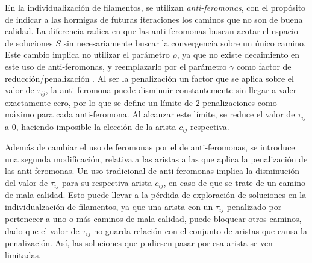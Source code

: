 En la individualizaci\'on de filamentos, se utilizan {\it anti-feromonas}, con el prop\'osito de indicar a las hormigas de futuras iteraciones los caminos que no son de buena calidad. La diferencia radica en que las anti-feromonas buscan acotar el espacio de soluciones $S$ sin necesariamente buscar la convergencia sobre un \'unico camino. Este cambio implica no utilizar el par\'ametro $\rho$, ya que no existe decaimiento en este uso de anti-feromonas, y reemplazarlo por el par\'ametro $\gamma$ como factor de reducci\'on/penalizaci\'on . Al ser la penalizaci\'on un factor que se aplica sobre el valor de $\tau_{ij}$, la anti-feromona puede disminuir constantemente sin llegar a valer exactamente cero, por lo que se define un l\'imite de 2 penalizaciones como m\'aximo para cada anti-feromona. Al alcanzar este l\'imite, se reduce el valor de $\tau_{ij}$ a 0, haciendo imposible la elecci\'on de la arista $c_{ij}$ respectiva.

Adem\'as de cambiar el uso de feromonas por el de anti-feromonas, se introduce una segunda modificaci\'on, relativa a las aristas a las que aplica la penalizaci\'on de las anti-feromonas. Un uso tradicional de anti-feromonas implica la disminuci\'on del valor de $\tau_{ij}$ para su respectiva arista $c_{ij}$, en caso de que se trate de un camino de mala calidad. 
Esto puede llevar a la p\'erdida de exploraci\'on de soluciones en la individualzaci\'on de filamentos, ya que una arista con un $\tau_{ij}$ penalizado por pertenecer a uno o m\'as caminos de mala calidad, puede bloquear otros caminos, dado que el valor de $\tau_{ij}$ no guarda relaci\'on con el conjunto de aristas que causa la penalizaci\'on. As\'i, las soluciones que pudiesen pasar por esa arista se ven limitadas.

 

